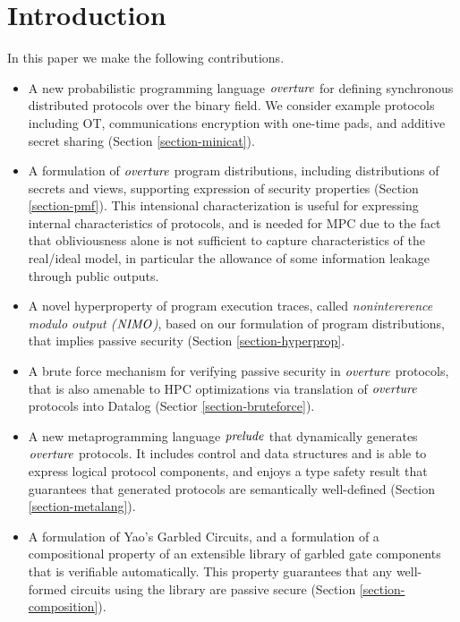 \section{Introduction}

In this paper we make the following contributions.
\begin{itemize}
\item A new probabilistic programming language $\mathit{overture}$ for defining
  synchronous distributed protocols over the binary field. We consider example
  protocols including OT, communications encryption with one-time
  pads, and additive secret sharing (Section \ref{section-minicat}).
\item A formulation of $\mathit{overture}$ program distributions, including
  distributions of secrets and views, supporting expression of security
  properties (Section \ref{section-pmf}). This intensional characterization
  is useful for expressing internal characteristics of protocols, and
  is needed for MPC due to the fact that obliviousness alone is not sufficient
  to capture characteristics of the real/ideal model, in particular the
  allowance of some information leakage through public outputs. 
\item A novel hyperproperty of program execution traces, called
  \emph{nonintererence modulo output ($\mathit{NIMO}$)}, based on our
  formulation of program distributions, that implies passive security
  (Section \ref{section-hyperprop}.
\item A brute force mechanism for verifying passive security in
  $\mathit{overture}$ protocols, that is also amenable to HPC optimizations via
  translation of $\mathit{overture}$ protocols into Datalog (Sectior \ref{section-bruteforce}). 
\item A new metaprogramming language $\mathit{prelude}$ that dynamically
  generates $\mathit{overture}$ protocols. It includes control and data structures
  and is able to express logical protocol components, and enjoys a
  type safety result that guarantees that generated protocols
  are semantically well-defined (Section \ref{section-metalang}).
\item A formulation of Yao's Garbled Circuits, and a formulation of a
  compositional property of an extensible library of garbled gate
  components that is verifiable automatically. This property
  guarantees that any well-formed circuits using the library are
  passive secure (Section \ref{section-composition}).
\end{itemize}

